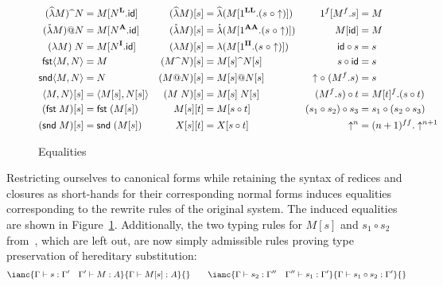 \documentclass{eptcs}
\makeatletter
\newcommand{\lhat}[1]{\widehat{\;#1\;}}
\newcommand\afflam{\mathring{\lambda}}
\newcommand\affapp{{@}}
\newcommand\fI{\textup{$\mathbf{I}$}}
\newcommand\fA{\textup{$\mathbf{A}$}}
\newcommand\fL{\textup{$\mathbf{L}$}}
\theoremstyle{definition}
\makeatother
\begin{document}
\begin{figure}
\begin{align*}
(\widehat{\lambda}M)\lhat{}N &= M[N^\fL.\textsf{id}] & (\widehat{\lambda}M)[s] &= \widehat{\lambda}(M[1^{\fL\fL}.(s\;\circ\uparrow)]) & 1^f[M^{f}.s] &= M \\
(\afflam M)\affapp N &= M[N^\fA.\textsf{id}]         & (\afflam M)[s] &= \afflam (M[1^{\fA\fA}.(s\;\circ\uparrow)])                   & M[\textsf{id}] &= M \\
(\lambda M)\;N &= M[N^\fI.\textsf{id}]               & (\lambda M)[s] &= \lambda (M[1^{\fI\fI}.(s\;\circ\uparrow)])                   & \textsf{id}\circ s &= s \\
\textsf{fst}\langle M,N\rangle &= M                  & (M\lhat{}N)[s] &= M[s]\lhat{}N[s]                                              & s\circ\textsf{id} &= s \\
\textsf{snd}\langle M,N\rangle &= N                  & (M\affapp N)[s] &= M[s]\affapp N[s]                                            & \uparrow\circ\; (M^f.s) &= s \\
\langle M,N\rangle[s] &= \langle M[s],N[s]\rangle    & (M\;N)[s] &= M[s]\;N[s]                                                        & (M^f.s)\circ t &= M[t]^f.(s\circ t) \\
(\textsf{fst}\;M)[s] &= \textsf{fst}\;(M[s])         & M[s][t] &= M[s\circ t]                                                         & (s_1\circ s_2)\circ s_3 &= s_1\circ (s_2\circ s_3) \\
(\textsf{snd}\;M)[s] &= \textsf{snd}\;(M[s])         & X[s][t] &= X[s\circ t]                                                         & \uparrow^n &= (n+1)^{ff}.\uparrow^{n+1}
\end{align*}
\caption{Equalities\label{fig:equalities}}
\end{figure} 

Restricting ourselves to canonical forms while retaining the syntax of
redices and closures as short-hands for their corresponding normal forms
induces equalities corresponding to the rewrite rules of the original
system.  The induced equalities are shown in Figure~\ref{fig:equalities}.
Additionally, the two typing rules for $M[s]$ and $s_1\circ s_2$ from~\cite{SchackNielsen10ijcar},
which are left out, are now simply admissible rules proving type
preservation of hereditary substitution:
\[
\ianc{\Gamma\vdash s:\Gamma'\quad \Gamma'\vdash M :A}{\Gamma\vdash
M[s]:A}{}
\qquad
\ianc{\Gamma\vdash s_2:\Gamma''\quad\Gamma''\vdash
s_1:\Gamma'}{\Gamma\vdash s_1\circ s_2:\Gamma'}{}
\]
\end{document}
